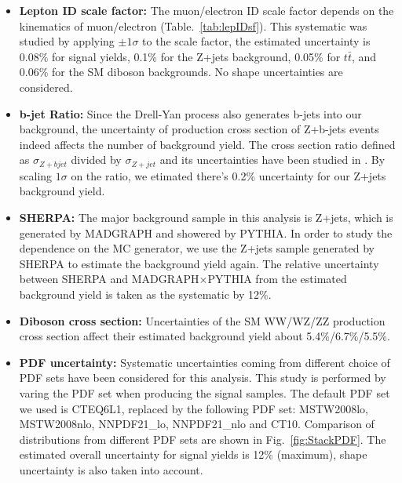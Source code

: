 \begin{itemize}
\item \textbf{Lepton ID scale factor:} The muon/electron ID scale factor depends on the kinematics of muon/electron (Table.~\ref{tab:lepIDsf}). This systematic was studied by applying $\pm 1 \sigma$ to the scale factor, the estimated uncertainty is 0.08\% for signal yields, 0.1\% for the Z+jets background, 0.05\% for $t\bar{t}$, and 0.06\% for the SM diboson backgrounds. No shape uncertainties are considered.
\item \textbf{b-jet Ratio:} Since the Drell-Yan process also generates b-jets into our background, the uncertainty of production cross section of Z+b-jets events indeed affects the number of background yield. The cross section ratio defined as $\sigma_{Z+bjet}$ divided by $\sigma_{Z+jet}$ and its uncertainties have been studied in \cite{SMP-13-004}. By scaling $1\sigma$ on the ratio, we etimated there's 0.2\% uncertainty for our Z+jets background yield.
\item \textbf{SHERPA:} The major background sample in this analysis is Z+jets, which is generated by MADGRAPH and showered by PYTHIA. In order to study the dependence on the MC generator, we use the Z+jets sample generated by SHERPA\cite{SHERPA} to estimate the background yield again. The relative uncertainty between SHERPA and MADGRAPH$\times$PYTHIA from the estimated background yield is taken as the systematic by 12\%.
\item \textbf{Diboson cross section:} Uncertainties of the SM WW/WZ/ZZ production cross section affect their estimated background yield about 5.4\%/6.7\%/5.5\%.
\item \textbf{PDF uncertainty:} Systematic uncertainties coming from different choice of PDF sets have been considered for this analysis. This study is performed by varing the PDF set when producing the signal samples. The default PDF set we used is CTEQ6L1, replaced by the following PDF set: MSTW2008lo, MSTW2008nlo, NNPDF21\_lo, NNPDF21\_nlo and CT10. Comparison of distributions from different PDF sets are shown in Fig.~\ref{fig:StackPDF}. The estimated overall uncertainty for signal yields is 12\% (maximum), shape uncertainty is also taken into account.
\end{itemize}

